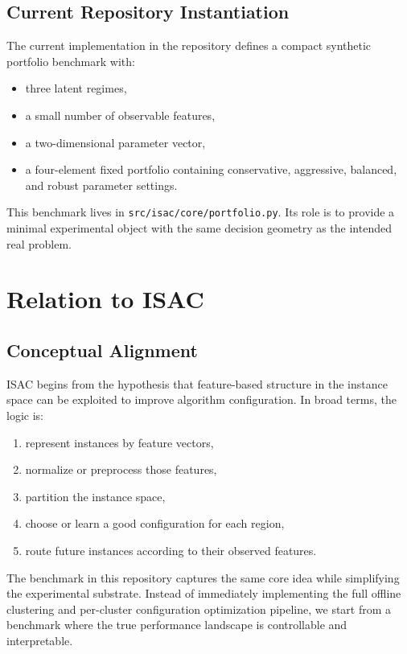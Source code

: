 \documentclass[11pt]{report}
\begin{document}
\section{Current Repository Instantiation}

The current implementation in the repository defines a compact synthetic portfolio benchmark with:
\begin{itemize}[leftmargin=2em]
\item three latent regimes,
\item a small number of observable features,
\item a two-dimensional parameter vector,
\item a four-element fixed portfolio containing conservative, aggressive, balanced, and robust parameter settings.
\end{itemize}

This benchmark lives in \texttt{src/isac/core/portfolio.py}. Its role is to provide a minimal experimental object with the same decision geometry as the intended real problem.

\chapter{Relation to ISAC}

\section{Conceptual Alignment}

ISAC begins from the hypothesis that feature-based structure in the instance space can be exploited to improve algorithm configuration. In broad terms, the logic is:
\begin{enumerate}[leftmargin=2em]
\item represent instances by feature vectors,
\item normalize or preprocess those features,
\item partition the instance space,
\item choose or learn a good configuration for each region,
\item route future instances according to their observed features.
\end{enumerate}

The benchmark in this repository captures the same core idea while simplifying the experimental substrate. Instead of immediately implementing the full offline clustering and per-cluster configuration optimization pipeline, we start from a benchmark where the true performance landscape is controllable and interpretable.
\end{document}
